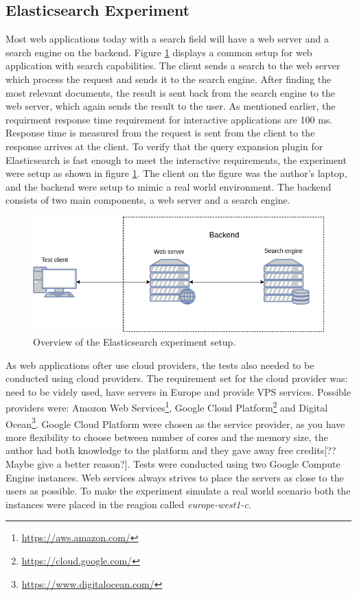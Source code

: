 \subsection{Elasticsearch Experiment}
Most web applications today with a search field will have a web server and a search engine on the backend.
Figure \ref{fig:elasticsearch-experiment-setup} displays a common setup for web application with search capabilities.
The client sends a search to the web server which process the request and sends it to the search engine.
After finding the most relevant documents, the result is sent back from the search engine to the web server,
which again sends the result to the user.
As mentioned earlier,
the requirment response time requirement for interactive applications are 100 ms.
Response time is measured from the request is sent from the client to the response arrives at the client.
To verify that the query expansion plugin for Elasticsearch is fast enough to meet the interactive requirements,
the experiment were setup as shown in figure \ref{fig:elasticsearch-experiment-setup}.
The client on the figure was the author's laptop,
and the backend were setup to mimic a real world environment.
The backend consists of two main components, a web server and a search engine.

\begin{figure}[h!]
  \centering \includegraphics[width=0.9\linewidth]{img/elasticsearch-experiment-setup.png}
  \caption{Overview of the Elasticsearch experiment setup.}
  \label{fig:elasticsearch-experiment-setup}
\end{figure}



As web applications ofter use cloud providers, the tests also needed to be conducted using cloud providers.
The requirement set for the cloud provider was: need to be videly used, have servers in Europe and provide VPS services.
Possible providers were: Amozon Web Services\footnote{\url{https://aws.amazon.com/}},
Google Cloud Platform\footnote{\url{https://cloud.google.com/}} and Digital Ocean\footnote{\url{https://www.digitalocean.com/}}.
Google Cloud Platform were chosen as the service provider, as you have more flexibility to choose between number of cores and the memory size,
the author had both knowledge to the platform and they gave away free credits[?? Maybe give a better reason?].
Tests were conducted using two Google Compute Engine instances.
Web services always strives to place the servers as close to the users as possible.
To make the experiment simulate a real world scenario both the instances were placed in the reagion called \textit{europe-west1-c}.

